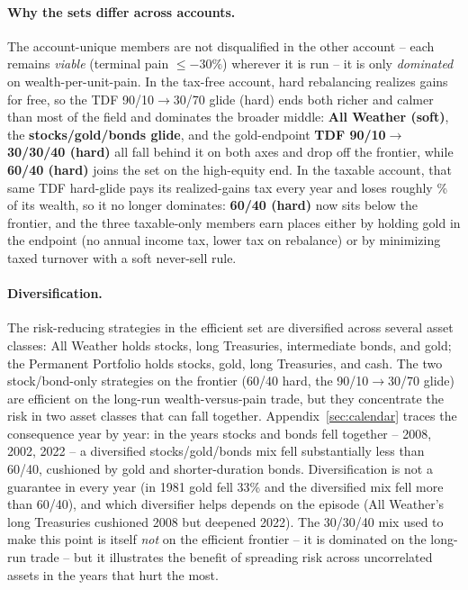 \documentclass[11pt]{article}
\begin{document}
\paragraph{Why the sets differ across accounts.} The account-unique members are not disqualified in
the other account -- each remains \emph{viable} (terminal pain $\leq -30\%$) wherever it is run -- it
is only \emph{dominated} on wealth-per-unit-pain. In the tax-free account, hard rebalancing realizes
gains for free, so the TDF 90/10$\to$30/70 glide (hard) ends both richer and calmer than most of the
field and dominates the broader middle: \textbf{All Weather (soft)}, the \textbf{stocks/gold/bonds
glide}, and the gold-endpoint \textbf{TDF 90/10$\to$30/30/40 (hard)} all fall behind it on both axes
and drop off the frontier, while \textbf{60/40 (hard)} joins the set on the high-equity end. In the
taxable account, that same TDF hard-glide pays its realized-gains tax every year and loses roughly
\HardGlideTaxLossPct\% of its wealth, so it no longer dominates: \textbf{60/40 (hard)} now sits below the frontier, and
the three taxable-only members earn places either by holding gold in the endpoint (no annual income
tax, lower tax on rebalance) or by minimizing taxed turnover with a soft never-sell rule.

\paragraph{Diversification.} The risk-reducing strategies in the efficient set are diversified across
several asset classes: All Weather holds stocks, long Treasuries, intermediate bonds, and gold; the
Permanent Portfolio holds stocks, gold, long Treasuries, and cash. The two stock/bond-only strategies
on the frontier (60/40 hard, the 90/10$\to$30/70 glide) are efficient on the long-run wealth-versus-pain
trade, but they concentrate the risk in two asset classes that can fall together.
Appendix~\ref{sec:calendar} traces the consequence year by year: in the years stocks and bonds fell
together -- 2008, 2002, 2022 -- a diversified stocks/gold/bonds mix fell substantially less than 60/40,
cushioned by gold and shorter-duration bonds. Diversification is not a guarantee in every year (in 1981
gold fell 33\% and the diversified mix fell more than 60/40), and which diversifier helps depends on the
episode (All Weather's long Treasuries cushioned 2008 but deepened 2022). The 30/30/40 mix used to make
this point is itself \emph{not} on the efficient frontier -- it is dominated on the long-run trade -- but
it illustrates the benefit of spreading risk across uncorrelated assets in the years that hurt the most.
\end{document}
